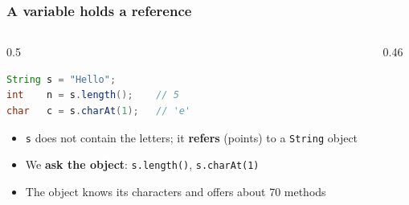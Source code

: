 \documentclass[aspectratio=169,10pt,compress]{beamer}
\begin{document}
\begin{frame}[t,fragile] \frametitle{A variable holds a reference}
  \begin{columns}[T]
    \begin{column}{0.5\textwidth}


\begin{lstlisting}[style=codesnippet, language=Java]
String s = "Hello";
int    n = s.length();    // 5
char   c = s.charAt(1);   // 'e'
\end{lstlisting}



      \begin{itemize}\small
        \item \texttt{s} does not contain the letters; it \textbf{refers} (points) to a \texttt{String} object
        \item We \textbf{ask the object}: \texttt{s.length()}, \texttt{s.charAt(1)}
        \item The object knows its characters and offers about 70 methods
      \end{itemize}
    \end{column}
    \begin{column}{0.46\textwidth}
      \begin{center}
      \end{center}
    \end{column}
  \end{columns}
\end{frame}
\end{document}
